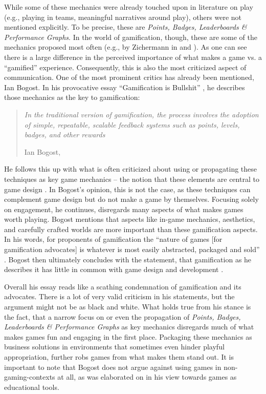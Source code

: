 While some of these mechanics were already touched upon in literature on play (e.g., playing in teams, meaningful narratives around play), others were not mentioned explicitly. To be precise, these are \textit{Points, Badges, Leaderboards \& Performance Graphs}. In the world of gamification, though, these are some of the mechanics proposed most often (e.g., by Zichermann in \cite[p. 3]{zichermann2010game} and \cite[p. 35-50]{zichermann2011gamification}). As one can see there is a large difference in the perceived importance of what makes a game vs. a \enquote{gamified} experience. Consequently, this is also the most criticized aspect of communication. One of the most prominent critics has already been mentioned, Ian Bogost. In his provocative essay \enquote{Gamification is Bullshit} \cite{bogost2014gamification}, he describes those mechanics as the key to gamification:

\begin{quote}
  \textit{In the traditional version of gamification, the process involves the adoption of simple, repeatable, scalable feedback systems such as points, levels, badges, and other rewards}

  \footnotesize{Ian Bogost, \cite[p. 68]{bogost2014gamification}}
\end{quote}

He follows this up with what is often criticized about using or propagating these techniques as key game mechanics -- the notion that these elements are central to game design \cite[p. 68]{bogost2014gamification}. In Bogost's opinion, this is not the case, as these techniques can complement game design but do not make a game by themselves. Focusing solely on engagement, he continues, disregards many aspects of what makes games worth playing. Bogost mentions that aspects like in-game mechanics, aesthetics, and carefully crafted worlds are more important than these gamification aspects. In his words, for proponents of gamification the \enquote{nature of games [for gamification advocates] is whatever is most easily abstracted, packaged and sold} \cite[p. 68]{bogost2014gamification}. Bogost then ultimately concludes with the statement, that gamification as he describes it has little in common with game design and development \cite[p. 72]{bogost2014gamification}.

Overall his essay reads like a scathing condemnation of gamification and its advocates. There is a lot of very valid criticism in his statements, but the argument might not be as black and white. What holds true from his stance is the fact, that a narrow focus on or even the propagation of \textit{Points, Badges, Leaderboards \& Performance Graphs} as key mechanics disregards much of what makes games fun and engaging in the first place. Packaging these mechanics as business solutions in environments that sometimes even hinder playful appropriation, further robs games from what makes them stand out. It is important to note that Bogost does not argue against using games in non-gaming-contexts at all, as was elaborated on in his view towards games as educational tools.


